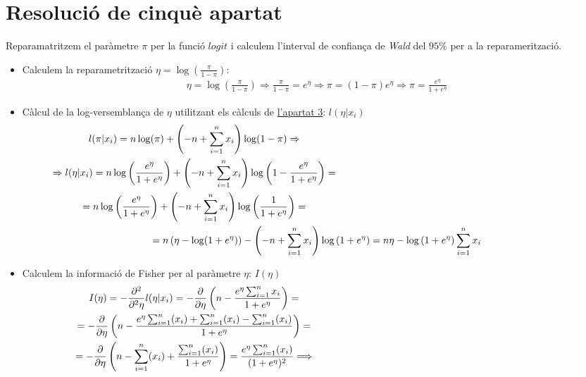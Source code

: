 \documentclass[12pt]{article}
\begin{document}
\section{Resolució de cinquè apartat}
Reparamatritzem el paràmetre $\pi$ per la funció $logit$ i calculem l'interval de confiança de \textit{Wald} del $95\%$ per a la reparamerització.
\begin{itemize}
\item Calculem la reparametrització $\eta = \log\left( \frac{\pi}{1-\pi} \right)$:
\begin{multline*}
\eta = \log\left( \frac{\pi}{1-\pi} \right) \Rightarrow \frac{\pi}{1-\pi} = e^{\eta} \Rightarrow \pi = (1-\pi)e^{\eta}\Rightarrow \pi = \frac{e^{\eta}}{1+e^{\eta}}
\end{multline*}
\item Càlcul de la log-versemblança de $\eta$ utilitzant els càlculs de \href{estimador}{\textcolor{blue(ncs)}{l'apartat 3}}: $l(\eta|x_i)$
\begin{multline*}
l(\pi|x_i)= n\log(\pi)+ \left(-n + \sum_{i=1}^n x_i\right)\log(1-\pi) \Rightarrow \textcolor{white}{qqqqqqqqqqqqqqqqqqqqqqqqqqqqqqqqqqqqqqqqqqqqqqqqqqq} \\ \Rightarrow l(\eta|x_i) = n\log\left(\frac{e^{\eta}}{1+e^{\eta}}\right)+ \left(-n + \sum_{i=1}^n x_i\right)\log\left(1-\frac{e^{\eta}}{1+e^{\eta}}\right) = \textcolor{white}{qqqqqqqqqqqqqqqqqqqqqqqqqqqqqqqqqqqqqqqqqqqqqqqqqqq}
\\ = n\log\left(\frac{e^{\eta}}{1+e^{\eta}}\right)+ \left(-n + \sum_{i=1}^n x_i\right)\log\left(\frac{1}{1+e^{\eta}}\right) = \textcolor{white}{qqqqqqqqqqqqqqqqqqqqqqqqqqqqqqqqqqqqqqqqqqqqqqqqqqq} \\ =n\left( \eta -\log(1+e^\eta)\right) - \left(-n + \sum_{i=1}^n x_i\right)\log\left( 1+e^\eta \right) = n\eta -\log\left( 1+e^\eta \right)\sum_{i=1}^n x_i
\end{multline*}
\item Calculem la informació de Fisher per al paràmetre $\eta$: $I(\eta)$
\begin{multline*}
I(\eta)= - \frac{\partial^2}{\partial^2\eta} l(\eta|x_i) = - \frac{\partial}{\partial\eta} \left( n-\frac{e^\eta\sum_{i=1}^n x_i}{1+e^\eta} \right) = \textcolor{white}{qqqqqqqqqqqqqqqqqqqqqqqqqqqqqqqqqqqqqqqqqqqqqqqqqqq}\\ = - \frac{\partial}{\partial\eta} \left( n-\frac{e^\eta\sum_{i=1}^n (x_i) + \sum_{i=1}^n (x_i) - \sum_{i=1}^n (x_i) }{1+e^\eta} \right) =\textcolor{white}{qqqqqqqqqqqqqqqqqqqqqqqqqqqqqqqqqqqqqqqqqqqqqqqqqqq} \\ = - \frac{\partial}{\partial\eta} \left( n-\sum_{i=1}^n (x_i) + \frac{\sum_{i=1}^n (x_i)}{1+e^\eta} \right) = \frac{e^\eta\sum_{i=1}^n (x_i)}{(1+e^\eta)^2} \Longrightarrow\textcolor{white}{qqqqqqqqqqqqqqqqqqqqqqqqqqqqqqqqqqqqqqqqqqqqqqqqqqq} \\

\end{multline*}
\end{itemize}
\end{document}
